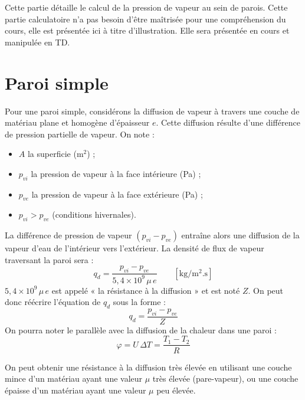 Cette partie détaille le calcul de la pression de vapeur au sein de parois. Cette partie calculatoire n'a pas besoin d'être maîtrisée pour une compréhension du cours, elle est présentée ici à titre d'illustration. Elle sera présentée en cours et manipulée en TD.

\section{Paroi simple}
Pour une paroi simple, considérons la diffusion de vapeur à travers une couche de matériau plane et homogène d'épaisseur $e$.
Cette diffusion résulte d'une différence de pression partielle de vapeur.
On note :
\begin{itemize}
  \item $A$ la superficie (m$^2$) ;
  \item $p_{vi}$ la pression de vapeur à la face intérieure (Pa) ;
  \item $p_{ve}$ la pression de vapeur à la face extérieure (Pa) ;
  \item $p_{vi} > p_{ve}$ (conditions hivernales).
\end{itemize}

La différence de pression de vapeur $(p_{vi} - p_{ve})$ entraîne alors une diffusion de la vapeur d'eau de l'intérieur vers l'extérieur.
La densité de flux de vapeur traversant la paroi sera :
\begin{equation}
  q_d = \frac{p_{vi} - p_{ve}}{5{,}4\times10^{9}\,\mu\,e} \qquad \mathrm{[kg/m^2.s]}
\end{equation}
$5{,}4\times10^{9}\,\mu\,e$ est appelé « la résistance à la diffusion » et est noté $Z$.
On peut donc réécrire l'équation de $q_d$ sous la forme :
\begin{equation}
  q_d = \frac{p_{vi} - p_{ve}}{Z}
\end{equation}
On pourra noter le parallèle avec la diffusion de la chaleur dans une paroi :
\begin{equation}
  \varphi = U\,\Delta T = \frac{T_1 - T_2}{R}
\end{equation}

On peut obtenir une résistance à la diffusion très élevée en utilisant une couche mince d'un matériau ayant une valeur $\mu$ très élevée (pare-vapeur), ou une couche épaisse d'un matériau ayant une valeur $\mu$ peu élevée.

